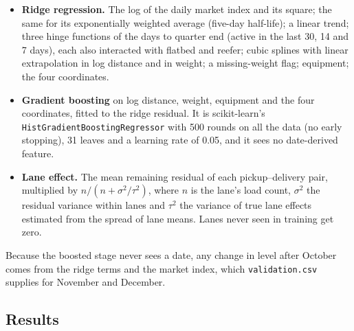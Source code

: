 \documentclass[11pt]{article}
\newcommand{\code}[1]{\texttt{#1}}
\begin{document}
\begin{itemize}
\item \textbf{Ridge regression.} The log of the daily market index and its square; the
same for its exponentially weighted average (five-day half-life); a linear trend; three
hinge functions of the days to quarter end (active in the last 30, 14 and 7 days), each
also interacted with flatbed and reefer; cubic splines with linear extrapolation in log
distance and in weight; a missing-weight flag; equipment; the four coordinates.
\item \textbf{Gradient boosting} on log distance, weight, equipment and the four
coordinates, fitted to the ridge residual. It is scikit-learn's
\code{HistGradientBoostingRegressor} with 500 rounds on all the data (no early stopping),
31 leaves and a learning rate of 0.05, and it sees no date-derived feature.
\item \textbf{Lane effect.} The mean remaining residual of each pickup--delivery pair,
multiplied by $n/(n + \sigma^2/\tau^2)$, where $n$ is the lane's load count, $\sigma^2$ the
residual variance within lanes and $\tau^2$ the variance of true lane effects estimated from the spread
of lane means. Lanes never seen in training get zero.
\end{itemize}

Because the boosted stage never sees a date, any change in level after October comes from
the ridge terms and the market index, which \code{validation.csv} supplies for November
and December.

\subsection{Results}
\end{document}
